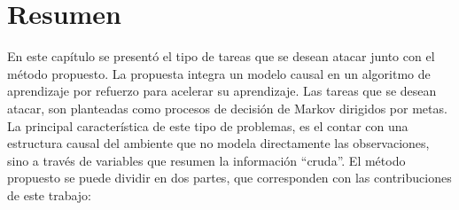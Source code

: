  
 
 
 \clearpage
 \section{Resumen}
 
En este capítulo se presentó el tipo de tareas que se 
desean atacar junto con el método propuesto. La propuesta
integra un modelo causal en un algoritmo de aprendizaje por refuerzo para
acelerar su aprendizaje.
Las tareas que se desean atacar, son 
planteadas como procesos de decisión de Markov dirigidos por metas.
La principal característica de este tipo de problemas,
es el contar con una estructura causal del ambiente que 
no modela directamente las observaciones, sino a través de variables 
que resumen la información ``cruda''.
El método propuesto se puede dividir en dos partes, que
corresponden con las contribuciones de este trabajo:

